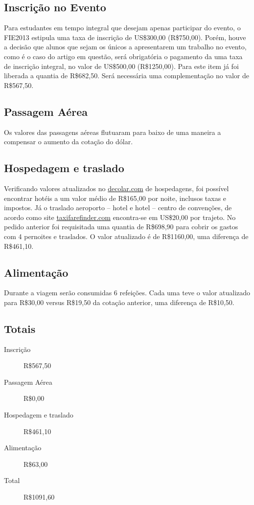 \documentclass[brazil]{article}
\newcommand{\usd}{US\$}
\newcommand{\brl}{R\$}
\begin{document}
\subsection{Inscrição no Evento}
Para estudantes em tempo integral que desejam apenas participar do evento, o FIE2013 estipula uma taxa de inscrição de \usd300,00 (\brl750,00). Porém, houve a decisão que alunos que sejam os únicos a apresentarem um trabalho no evento, como é o caso do artigo em questão, será obrigatória o pagamento da uma taxa de inscrição integral, no valor de \usd500,00 (\brl1250,00). Para este item já foi liberada a quantia de \brl682,50. Será necessária uma complementação no valor de \brl567,50.

\subsection{Passagem Aérea}
Os valores das passagens aéreas flutuaram para baixo de uma maneira a compensar o aumento da cotação do dólar.

\subsection{Hospedagem e traslado}
Verificando valores atualizados no \url{decolar.com} de hospedagens, foi possível encontrar hotéis a um valor médio de \brl165,00 por noite, inclusos taxas e impostos. Já o traslado aeroporto -- hotel e hotel -- centro de convenções, de acordo como site \url{taxifarefinder.com} encontra-se em \usd20,00 por trajeto. No pedido anterior foi requisitada uma quantia de \brl698,90 para cobrir os gastos com 4 pernoites e traslados. O valor atualizado é de \brl1160,00, uma diferença de \brl461,10.

\subsection{Alimentação}
Durante a viagem serão consumidas 6 refeições. Cada uma teve o valor atualizado para \brl30,00 versus \brl19,50 da cotação anterior, uma diferença de \brl10,50.

\subsection{Totais}
\begin{description}
	\item[Inscrição] \brl567,50
	\item[Passagem Aérea] \brl0,00
	\item[Hospedagem e traslado] \brl461,10
	\item[Alimentação] \brl63,00
	\item[Total] \brl1091,60
\end{description}
\end{document}
